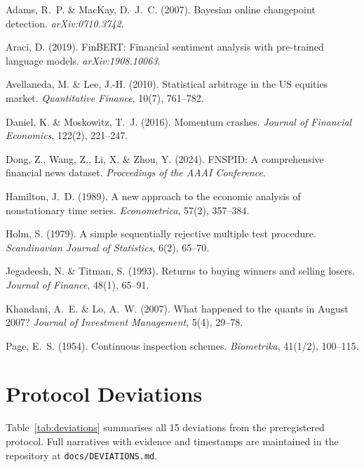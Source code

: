 \documentclass[11pt,a4paper]{article}
\begin{document}
\begin{description}[font=\normalfont, leftmargin=1.5em, labelindent=0em]
\item Adams, R.~P. \& MacKay, D.~J.~C. (2007). Bayesian online changepoint
  detection. \emph{arXiv:0710.3742}.
\item Araci, D. (2019). FinBERT: Financial sentiment analysis with pre-trained
  language models. \emph{arXiv:1908.10063}.
\item Avellaneda, M. \& Lee, J.-H. (2010). Statistical arbitrage in the US
  equities market. \emph{Quantitative Finance}, 10(7), 761--782.
\item Daniel, K. \& Moskowitz, T.~J. (2016). Momentum crashes. \emph{Journal
  of Financial Economics}, 122(2), 221--247.
\item Dong, Z., Wang, Z., Li, X. \& Zhou, Y. (2024). FNSPID: A comprehensive
  financial news dataset. \emph{Proceedings of the AAAI Conference}.
\item Hamilton, J.~D. (1989). A new approach to the economic analysis of
  nonstationary time series. \emph{Econometrica}, 57(2), 357--384.
\item Holm, S. (1979). A simple sequentially rejective multiple test
  procedure. \emph{Scandinavian Journal of Statistics}, 6(2), 65--70.
\item Jegadeesh, N. \& Titman, S. (1993). Returns to buying winners and
  selling losers. \emph{Journal of Finance}, 48(1), 65--91.
\item Khandani, A.~E. \& Lo, A.~W. (2007). What happened to the quants in
  August 2007? \emph{Journal of Investment Management}, 5(4), 29--78.
\item Page, E.~S. (1954). Continuous inspection schemes. \emph{Biometrika},
  41(1/2), 100--115.
\end{description}

\appendix

\section{Protocol Deviations}\label{app:deviations}

Table~\ref{tab:deviations} summarises all 15 deviations from the preregistered
protocol. Full narratives with evidence and timestamps are maintained in the
repository at \texttt{docs/DEVIATIONS.md}.
\end{document}
